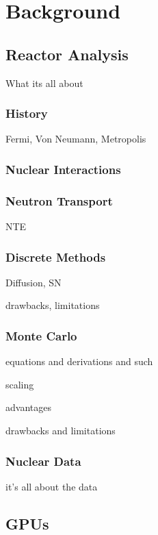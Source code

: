 \chapter{Background}



\section{Reactor Analysis}

What its all about

\subsection{History}

Fermi, Von Neumann, Metropolis

\subsection{Nuclear Interactions}

\subsection{Neutron Transport}

NTE

\subsection{Discrete Methods}

Diffusion, SN

drawbacks, limitations

\subsection{Monte Carlo}

equations and derivations and such

scaling

advantages

drawbacks and limitations

\subsection{Nuclear Data}

it's all about the data


\section{GPUs}

